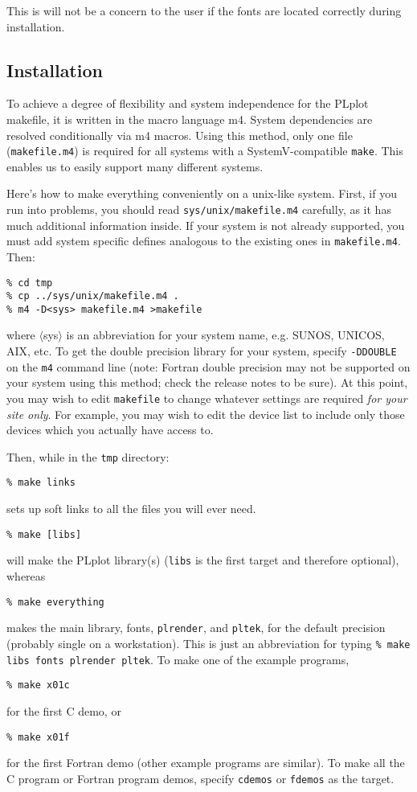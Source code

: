 This is will not be a concern to the user if the fonts are located correctly
during installation.


\subsection{Installation}

To achieve a degree of flexibility and system independence for the PLplot
makefile, it is written in the macro language m4.  System dependencies are
resolved conditionally via m4 macros.  Using this method, only one file
({\tt makefile.m4}) is required for all systems with a SystemV-compatible
{\tt make}.  This enables us to easily support many different systems.

Here's how to make everything conveniently on a unix-like system.  First,
if you run into problems, you should read {\tt sys/unix/makefile.m4}
carefully, as it has much additional information inside.  If your system is
not already supported, you must add system specific defines analogous to
the existing ones in {\tt makefile.m4}.  Then: 
\begin{verbatim}
% cd tmp
% cp ../sys/unix/makefile.m4 .
% m4 -D<sys> makefile.m4 >makefile 
\end{verbatim}
where $\langle$sys$\rangle$ is an abbreviation for your system name, e.g.
SUNOS, UNICOS, AIX, etc.  To get the double precision library for your
system, specify {\tt -DDOUBLE} on the {\tt m4} command line (note: Fortran
double precision may not be supported on your system using this method;
check the release notes to be sure).  At this point, you may wish to edit
{\tt makefile} to change whatever settings are required {\em for your site
only}.  For example, you may wish to edit the device list to include only
those devices which you actually have access to. 

Then, while in the {\tt tmp} directory:
%
\begin{verbatim}
% make links
\end{verbatim}
%
sets up soft links to all the files you will ever need.
%
\begin{verbatim}
% make [libs]
\end{verbatim}
%
will make the PLplot library(s) ({\tt libs} is the first target and
therefore optional), whereas
%
\begin{verbatim}
% make everything
\end{verbatim}
%
makes the main library, fonts, {\tt plrender}, and {\tt pltek}, for the
default precision (probably single on a workstation).  This is just an
abbreviation for typing {\tt \% make libs fonts plrender pltek}.
To make one of the example programs,
%
\begin{verbatim}
% make x01c
\end{verbatim}
%
for the first C demo, or
%
\begin{verbatim}
% make x01f
\end{verbatim}
%
for the first Fortran demo (other example programs are similar).  To make
all the C program or Fortran program demos, specify {\tt cdemos} or
{\tt fdemos} as the target.

